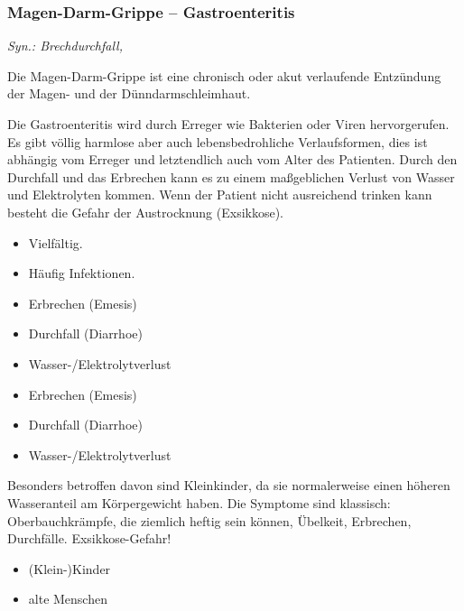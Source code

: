 \subsubsection{Magen-Darm-Grippe -- Gastroenteritis}

\emph{Syn.: Brechdurchfall, }

Die Magen-Darm-Grippe ist eine chronisch oder akut
verlaufende Entzündung der Magen- und der Dünndarmschleimhaut. 

{
Die Gastroenteritis wird durch Erreger
wie Bakterien oder Viren hervorgerufen. Es gibt völlig
harmlose aber auch lebensbedrohliche Verlaufsformen, dies ist abhängig vom Erreger und
letztendlich auch vom Alter des Patienten. Durch den
Durchfall und das Erbrechen kann es zu einem maßgeblichen
Verlust von Wasser und Elektrolyten kommen. Wenn der Patient
nicht ausreichend trinken kann besteht die Gefahr der Austrocknung (Exsikkose).
}{
\begin{itemize}
  \item Vielfältig.
  \item Häufig Infektionen.
\end{itemize}
}{}{}{}


{
\begin{itemize}
    \item Erbrechen (Emesis)
    \item Durchfall (Diarrhoe)
    \item Wasser-/Elektrolytverlust
\end{itemize}
}{
\begin{itemize}
    \item Erbrechen (Emesis)
    \item Durchfall (Diarrhoe)
    \item Wasser-/Elektrolytverlust
\end{itemize}
}{}{}{}

{
Besonders betroffen davon sind Kleinkinder, da sie
normalerweise einen höheren Wasseranteil am Körpergewicht
haben.  Die Symptome sind klassisch: Oberbauchkrämpfe,
die ziemlich heftig sein können, Übelkeit, Erbrechen, Durchfälle.
Exsikkose-Gefahr! 
}{
\begin{itemize}
    \item (Klein-)Kinder
    \item alte Menschen
\end{itemize}
}{}{}{}



